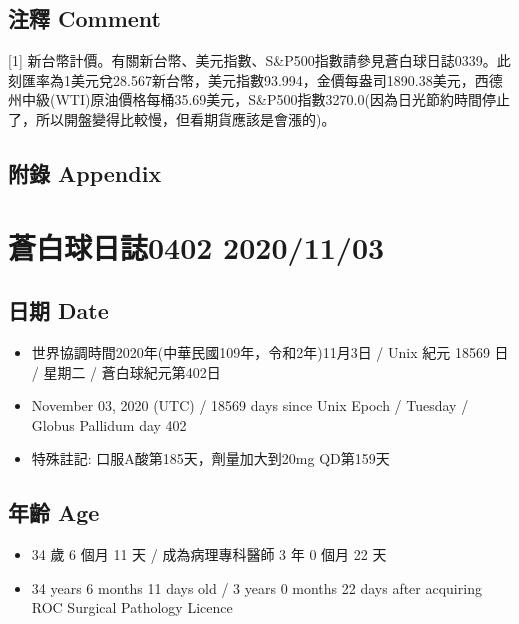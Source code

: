 \documentclass[a5paper, 11pt
]{book}
\providecommand{\tightlist}{%
  \setlength{\itemsep}{0pt}\setlength{\parskip}{0pt}}
\begin{document}
\hypertarget{ux6ce8ux91cb-comment-59}{%
\subsection{注釋 Comment}\label{ux6ce8ux91cb-comment-59}}

{[}1{]}
新台幣計價。有關新台幣、美元指數、S\&P500指數請參見蒼白球日誌0339。此刻匯率為1美元兌28.567新台幣，美元指數93.994，金價每盎司1890.38美元，西德州中級(WTI)原油價格每桶35.69美元，S\&P500指數3270.0(因為日光節約時間停止了，所以開盤變得比較慢，但看期貨應該是會漲的)。

\hypertarget{ux9644ux9304-appendix-59}{%
\subsection{附錄 Appendix}\label{ux9644ux9304-appendix-59}}

\hypertarget{ux84bcux767dux7403ux65e5ux8a8c0402-20201103}{%
\section{蒼白球日誌0402
2020/11/03}\label{ux84bcux767dux7403ux65e5ux8a8c0402-20201103}}

\hypertarget{ux65e5ux671f-date-60}{%
\subsection{日期 Date}\label{ux65e5ux671f-date-60}}

\begin{itemize}
\tightlist
\item
  世界協調時間2020年(中華民國109年，令和2年)11月3日 / Unix 紀元 18569 日
  / 星期二 / 蒼白球紀元第402日
\item
  November 03, 2020 (UTC) / 18569 days since Unix Epoch / Tuesday /
  Globus Pallidum day 402
\item
  特殊註記: 口服A酸第185天，劑量加大到20mg QD第159天
\end{itemize}

\hypertarget{ux5e74ux9f61-age-60}{%
\subsection{年齡 Age}\label{ux5e74ux9f61-age-60}}

\begin{itemize}
\tightlist
\item
  34 歲 6 個月 11 天 / 成為病理專科醫師 3 年 0 個月 22 天
\item
  34 years 6 months 11 days old / 3 years 0 months 22 days after
  acquiring ROC Surgical Pathology Licence
\end{itemize}
\end{document}
